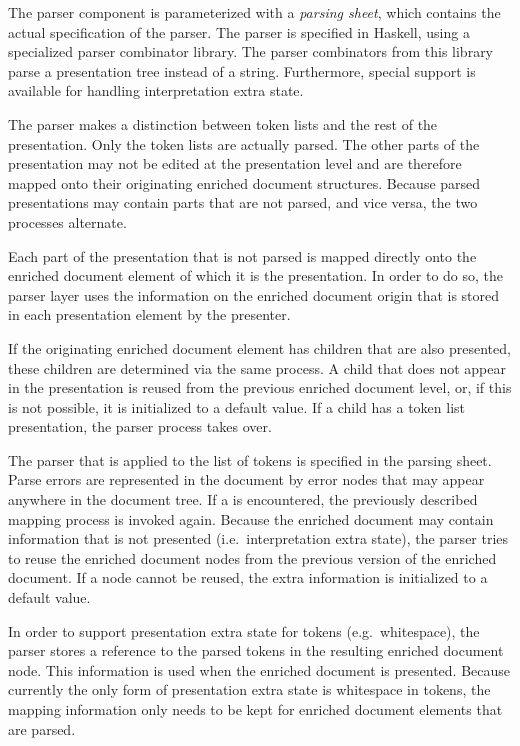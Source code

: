 \documentclass{speauth}
\begin{document}
The parser component is parameterized with a {\em parsing sheet}, which contains the actual specification of the parser. The parser is specified in Haskell, using a specialized parser combinator library. The parser combinators from this library parse a presentation tree instead of a string. Furthermore, special support is available for handling interpretation extra state.

The parser makes a distinction between token lists and the rest of the presentation. Only the token lists are actually parsed. The other parts of the presentation may not be edited at the presentation level and are therefore mapped onto their originating enriched document structures. Because parsed presentations may contain parts that are not parsed, and vice versa, the two processes alternate.

Each part of the presentation that is not parsed is mapped directly onto the enriched document element of which it is the presentation. In order to do so, the parser layer uses the information on the enriched document origin that is stored in each presentation element by the presenter.

If the originating enriched document element has children that are also presented, these children are determined via the same process. A child that does not appear in the presentation is reused from the previous enriched document level, or, if this is not possible, it is initialized to a default value. If a child has a token list presentation, the parser process takes over.

The parser that is applied to the list of tokens is specified  in the parsing sheet. Parse errors are represented in the document by error nodes that may appear anywhere in the document tree. If a  is encountered, the previously described mapping process is invoked again. Because the enriched document may contain information that is not presented (i.e.\ interpretation extra state), the parser tries to reuse the enriched document nodes from the previous version of the enriched document. If a node cannot be reused, the extra information is initialized to a default value. 

In order to support presentation extra state for tokens (e.g.\ whitespace), the parser stores a reference to the parsed tokens in the resulting enriched document node. This information is used when the enriched document is presented. Because currently the only form of presentation extra state is whitespace in tokens, the mapping information only needs to be kept for enriched document elements that are parsed.
\end{document}
